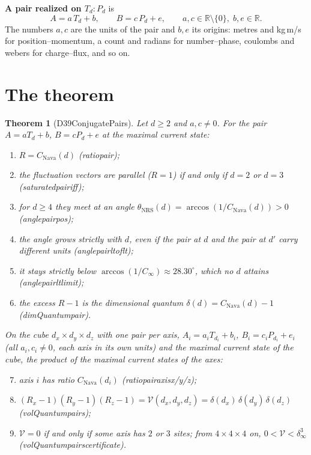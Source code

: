 \documentclass[11pt,a4paper]{article}
\newtheorem*{theorem}{Theorem}
\newcommand{\leanus}{\textunderscore\allowbreak}
\newcommand{\lean}[1]{{\small\ttfamily\let\_\leanus #1}}
\begin{document}
\textbf{A pair realized on $T_d{:}P_d$} is
\[
  A = a\,T_d + b, \qquad B = c\,P_d + e, \qquad a,c\in\mathbb R\setminus\{0\},\; b,e\in\mathbb R .
\]
The numbers $a,c$ are the units of the pair and $b,e$ its origins: metres and kg\,m/s for
position--momentum, a count and radians for number--phase, coulombs and webers for
charge--flux, and so on.

\section{The theorem}

\begin{theorem}[\lean{D39\_ConjugatePairs}]
Let $d\ge2$ and $a,c\neq0$. For the pair $A=aT_d+b$, $B=cP_d+e$ at the maximal current state:
\begin{enumerate}
  \item $R = C_{\mathrm{Nava}}(d)$ \hfill(\lean{ratio\_pair});
  \item the fluctuation vectors are parallel ($R=1$) if and only if $d=2$ or $d=3$
        \hfill(\lean{saturated\_pair\_iff});
  \item for $d\ge4$ they meet at an angle $\theta_{\mathrm{NRS}}(d)=\arccos(1/C_{\mathrm{Nava}}(d))>0$
        \hfill(\lean{angle\_pair\_pos});
  \item the angle grows strictly with $d$, even if the pair at $d$ and the pair at $d'$ carry
        different units \hfill(\lean{angle\_pair\_lt\_of\_lt});
  \item it stays strictly below $\arccos(1/C_\infty)\approx28.30^\circ$, which no $d$ attains
        \hfill(\lean{angle\_pair\_lt\_limit});
  \item the excess $R-1$ is the dimensional quantum $\delta(d)=C_{\mathrm{Nava}}(d)-1$
        \hfill(\lean{dimQuantum\_pair}).
\end{enumerate}
On the cube $d_x\times d_y\times d_z$ with one pair per axis, $A_i=a_iT_{d_i}+b_i$,
$B_i=c_iP_{d_i}+e_i$ (all $a_i,c_i\neq0$, each axis in its own units) and the maximal current
state of the cube, the product of the maximal current states of the axes:
\begin{enumerate}\setcounter{enumi}{6}
  \item axis $i$ has ratio $C_{\mathrm{Nava}}(d_i)$ \hfill(\lean{ratio\_pair\_axis\_x/y/z});
  \item $(R_x-1)(R_y-1)(R_z-1)=\mathcal V(d_x,d_y,d_z)=\delta(d_x)\,\delta(d_y)\,\delta(d_z)$
        \hfill(\lean{volQuantum\_pairs});
  \item $\mathcal V=0$ if and only if some axis has $2$ or $3$ sites; from $4\times4\times4$ on,
        $0<\mathcal V<\delta_\infty^3$ \hfill(\lean{volQuantum\_pairs\_certificate}).
\end{enumerate}
\end{theorem}
\end{document}
